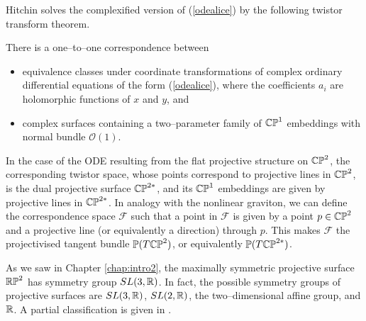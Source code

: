Hitchin \cite{hitchin} solves the complexified version of (\ref{odealice}) by the following twistor transform theorem.
\begin{theo}
There is a one--to--one correspondence between
\begin{itemize}
\item equivalence classes under coordinate transformations of complex ordinary differential equations of the form (\ref{odealice}), where the coefficients $a_i$ are holomorphic functions of $x$ and $y$, and
\item complex surfaces containing a two--parameter family of $\mathbb{CP}^1$ embeddings with normal bundle $\mathcal{O}(1)$.
\end{itemize}
\end{theo}
\noindent In the case of the ODE resulting from the flat projective structure on $\mathbb{CP}^2$, the corresponding twistor space, whose points correspond to projective lines in $\mathbb{CP}^2$, is the dual projective surface $\mathbb{CP}^{2*}$, and its $\mathbb{CP}^1$ embeddings are given by projective lines in $\mathbb{CP}^{2*}$. In analogy with the nonlinear graviton, we can define the correspondence space $\mathcal{F}$ such that a point in $\mathcal{F}$ is given by a point $p\in\mathbb{CP}^2$ and a projective line (or equivalently a direction) through $p$. This makes $\mathcal{F}$ the projectivised tangent bundle $\mathbb{P}(T\mathbb{CP}^2)$, or equivalently $\mathbb{P}(T\mathbb{CP}^{2*})$.

As we saw in Chapter \ref{chap:intro2}, the maximally symmetric projective surface $\mathbb{RP}^2$ has symmetry group $SL(3,\mathbb{R})$. In fact, the possible symmetry groups of projective surfaces are $SL(3, \mathbb{R})$, $SL(2,\mathbb{R})$, the two--dimensional affine group, and $\mathbb{R}$. A partial classification is given in \cite{Bryant}.

